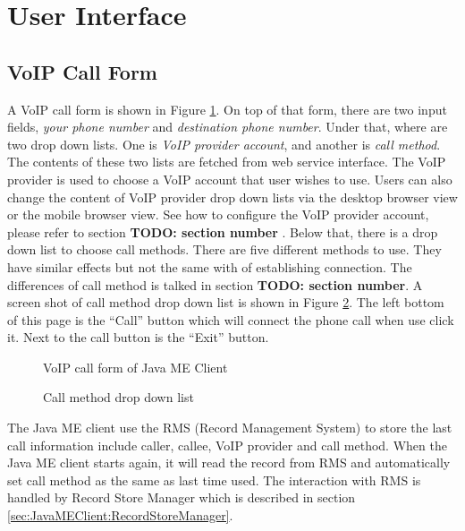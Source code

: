 \section{User Interface}
\label{sec:JavaMEClient:UserInterface}

\subsection{VoIP Call Form}
\label{sec:JavaMEClient:UserInterface:VoIPCallForm}

A VoIP call form is shown in Figure \ref{fig:VoIPCallFormOfJavaMEClient}. On top of that form, there are two input fields, \textit{your phone number} and \textit{destination phone number}. Under that, where are two drop down lists. One is \textit{VoIP provider account}, and another is \textit{call method}. The contents of these two lists are fetched from web service interface. The VoIP provider is used to choose a VoIP account that user wishes to use. Users can also change the content of VoIP provider drop down lists via the desktop browser view or the mobile browser view. See how to configure the VoIP provider account, please refer to section \textbf{TODO: section number} . Below that, there is a drop down list to choose call methods. There are five different methods to use. They have similar effects but not the same with of establishing connection. The differences of call method is talked in section \textbf{TODO: section number}. A screen shot of call method drop down list is shown in Figure \ref{fig:CallMethodDropDownList}. The left bottom of this page is the ``Call'' button which will connect the phone call when use click it. Next to the call button is the ``Exit'' button.

\begin{figure}[!hbtp]
\centering
{}
\caption{VoIP call form of Java ME Client}
\label{fig:VoIPCallFormOfJavaMEClient}
\end{figure}

\begin{figure}[!hbtp]
\centering
{}
\caption{Call method drop down list}
\label{fig:CallMethodDropDownList}
\end{figure}

The Java ME client use the RMS (Record Management System) to store the last call information include caller, callee, VoIP provider and call method. When the Java ME client starts again, it will read the record from RMS and automatically set call method as the same as last time used. The interaction with RMS is handled by \textsf{Record Store Manager} which is described in section \ref{sec:JavaMEClient:RecordStoreManager}.

